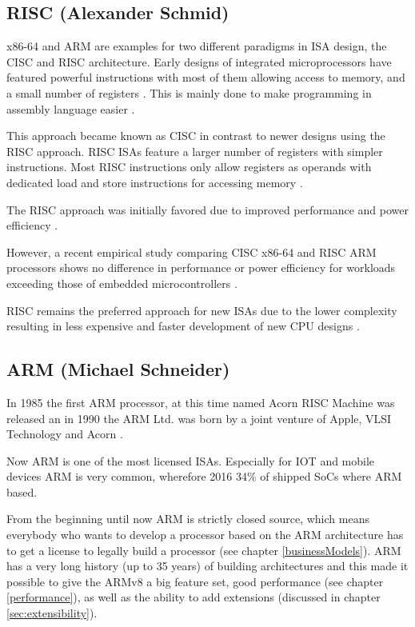\documentclass[conference]{IEEEtran}
\begin{document}
	\subsection{RISC (Alexander Schmid)}
	x86-64 and ARM are examples for two different paradigms in \gls{ISA} design, the \gls{CISC} and \gls{RISC} architecture.
	Early designs of integrated microprocessors have featured powerful instructions with most of them allowing access to memory,
	and a small number of registers \cite{George1990}. This is mainly done to make programming in assembly language easier \cite[page 73]{Stokes2006}.

	This approach became known as \gls{CISC} in contrast to newer designs using the \gls{RISC} approach.
	\gls{RISC} \glspl{ISA} feature a larger number of registers with simpler instructions.
	Most \gls{RISC} instructions only allow registers as operands with dedicated load and store instructions for accessing memory \cite{George1990}.

	The \gls{RISC} approach was initially favored due to improved performance and power efficiency \cite{George1990}.
	
	However, a recent empirical study comparing \gls{CISC} x86-64 and \gls{RISC} ARM processors shows no difference in performance or power efficiency
	for workloads exceeding those of embedded microcontrollers \cite{Blem2013}.

	\gls{RISC} remains the preferred approach for new \glspl{ISA} due to the lower complexity resulting in less expensive and faster
	development of new CPU designs \cite{George1990}. 

	\subsection{ARM (Michael Schneider)}
	In 1985 the first ARM processor, at this time named Acorn RISC Machine was released an in 1990 the ARM Ltd. was born by a joint venture of Apple, VLSI Technology and Acorn \cite{Levy2005}.

	 Now ARM is one of the most licensed \glspl{ISA}. Especially for IOT and mobile devices ARM is very common, wherefore 2016 34\% of shipped SoCs where ARM based. \cite[slide 7-10]{Holdings2018}

	From the beginning until now ARM is strictly closed source, which means everybody who wants to develop a processor based on the ARM architecture has to get a license to legally build a processor (see chapter \ref{businessModels}). ARM has a very long history (up to 35 years) of building architectures and this made it possible to give the ARMv8 a big feature set, good performance (see chapter \ref{performance}), as well as the ability to add extensions (discussed in chapter \ref{sec:extensibility}).
	
\end{document}

